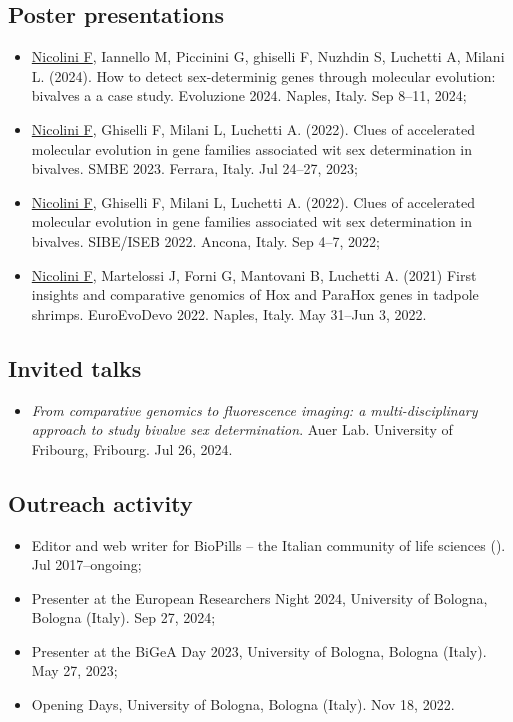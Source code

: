 \subsection*{Poster presentations}
\begin{itemize}
	\item \underline{Nicolini F}, Iannello M, Piccinini G, ghiselli F, Nuzhdin S, Luchetti A, Milani L. (2024). How to detect sex-determinig genes through molecular evolution: bivalves a a case study. Evoluzione 2024. Naples, Italy. Sep 8--11, 2024;
	\item \underline{Nicolini F}, Ghiselli F, Milani L, Luchetti A. (2022). Clues of accelerated molecular evolution in gene families associated wit sex determination in bivalves. SMBE 2023. Ferrara, Italy. Jul 24--27, 2023;
	\item \underline{Nicolini F}, Ghiselli F, Milani L, Luchetti A. (2022). Clues of accelerated molecular evolution in gene families associated wit sex determination in bivalves. SIBE/ISEB 2022. Ancona, Italy. Sep 4--7, 2022;
	\item \underline{Nicolini F}, Martelossi J, Forni G, Mantovani B, Luchetti A. (2021) First insights and comparative genomics of Hox and ParaHox genes in tadpole shrimps. EuroEvoDevo 2022. Naples, Italy. May 31--Jun 3, 2022.
\end{itemize}

\subsection*{Invited talks}
\begin{itemize}
	\item \textit{From comparative genomics to fluorescence imaging: a multi-disciplinary approach to study bivalve sex determination}. Auer Lab. University of Fribourg, Fribourg. Jul 26, 2024.
\end{itemize}

\subsection*{Outreach activity}
\begin{itemize}
	\item Editor and web writer for BioPills -- the Italian community of life sciences (). Jul 2017--ongoing;
	\item Presenter at the European Researchers\curlyapostrophe{} Night 2024, University of Bologna, Bologna (Italy). Sep 27, 2024;
	\item Presenter at the BiGeA Day 2023, University of Bologna, Bologna (Italy). May 27, 2023;
	\item Opening Days, University of Bologna, Bologna (Italy). Nov 18, 2022.
\end{itemize}

